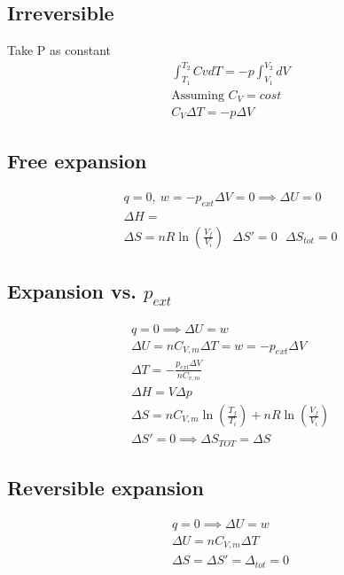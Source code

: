 \documentclass[a4paper]{report}
\begin{document}
\begin{multicols}{2}
        \subsection{Irreversible}
        Take P as constant
        \begin{gather*}
          \int _{T_1}^{T_2} CvdT = -p \int _{V_1}^{V_2}dV\\
          \text{Assuming } C_{V}= cost\\
          C_{V}\Delta T = -p \Delta V 
        \end{gather*}

        \subsection{Free expansion}

          \begin{gather*}
            q = 0, ~ w = -p_{ext} \Delta V = 0 \implies \Delta U = 0 \\
            \Delta H = \\
            \Delta S = nR\ln (\frac{V_f}{V_i}) ~ ~ ~ \Delta S' = 0 ~ ~ ~ \Delta S_{tot} = 0
          \end{gather*}
        \subsection{Expansion vs. $p_{ext}$}
           \begin{gather*}
             q = 0 \implies \Delta U = w \\
             \Delta U = nC_{V,m} \Delta T = w = -p_{ext} \Delta V \\
             \Delta T = -\frac{p_{ext}\Delta V}{nC_{v,m}}  \\
             \Delta H = V \Delta p \\
             \Delta S = nC_{V,m} \ln (\frac{T_{f}}{T_{i}}) + nR\ln (\frac{V_f}{V_{i}})\\
             \Delta S' = 0 \implies \Delta S_{TOT}= \Delta S 
         \end{gather*}
        \subsection{Reversible expansion}
          \begin{gather*}
            q = 0 \implies \Delta U = w \\
            \Delta U = nC_{V,m} \Delta T\\
            \Delta S = \Delta S' = \Delta _{tot} = 0
          \end{gather*}

\end{multicols}
\end{document}
